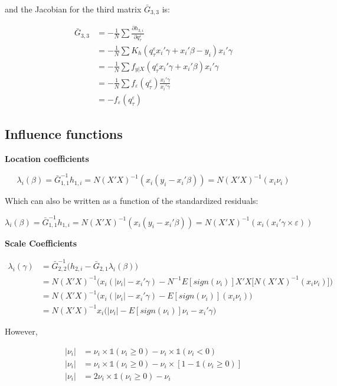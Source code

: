 \documentclass[
  authoryear,
  review,
  1p]{elsarticle}
\begin{document}
and the Jacobian for the third matrix \(\bar G_{3,3}\) is:

\[\begin{aligned}
\bar G_{3,3} &= -\frac{1}{N} \sum \frac{\partial h_{3,i}}{\partial q^\varepsilon_\tau} \\
 &= -\frac{1}{N} \sum K_h(q^\varepsilon_\tau x_i'\gamma +x_i'\beta - y_i ) x_i'\gamma \\
 &= -\frac{1}{N} \sum f_{y|X}(q^\varepsilon_\tau x_i'\gamma +x_i'\beta) x_i'\gamma \\
 &= -\frac{1}{N} \sum f_{\varepsilon}(q^\varepsilon_\tau) \frac{x_i'\gamma}{ x_i'\gamma} \\
 &= - f_{\varepsilon}(q^\varepsilon_\tau) 
\end{aligned}
\]

\hypertarget{influence-functions}{%
\subsection{Influence functions}\label{influence-functions}}

\textbf{Location coefficients}

\[\lambda_i(\beta) = \bar G^{-1}_{1,1} h_{1,i} = N (X'X)^{-1}(x_i (y_i-x_i'\beta)) = N (X'X)^{-1}(x_i \nu_i)
\]

Which can also be written as a function of the standardized residuals:

\[\lambda_i(\beta) = \bar G^{-1}_{1,1} h_{1,i} = N (X'X)^{-1}(x_i (y_i-x_i'\beta)) = N (X'X)^{-1}(x_i ( x_i'\gamma \times \varepsilon))
\]

\textbf{Scale Coefficients}

\[\begin{aligned}
\lambda_i(\gamma)&=\bar G_{2,2}^{-1}\Big(h_{2,i}-\bar G_{2,1} \lambda_i(\beta)\Big) \\
&=N (X'X)^{-1} \Big(x_i(|\nu_i|-x_i' \gamma) 
- N^{-1} E[sign(\nu_i)] X'X \big[ N (X'X)^{-1}(x_i \nu_i) \big] \Big) \\
&=N (X'X)^{-1} \Big(x_i(|\nu_i|-x_i' \gamma) - E[sign(\nu_i)] (x_i \nu_i)  \Big) \\
&=N (X'X)^{-1} x_i \Big( |\nu_i| - E[sign(\nu_i)] \nu_i -x_i' \gamma \Big) 
\end{aligned}
\]

However,

\[\begin{aligned}
|\nu_i| &= \nu_i \times \mathbb{1}(\nu_i \geq 0) - \nu_i \times \mathbb{1}(\nu_i < 0) \\
|\nu_i| &= \nu_i \times \mathbb{1}(\nu_i \geq 0) - \nu_i \times [1-\mathbb{1}(\nu_i \geq 0)] \\
|\nu_i| &= 2 \nu_i \times \mathbb{1}(\nu_i \geq 0) - \nu_i  
\end{aligned}
\]
\end{document}
